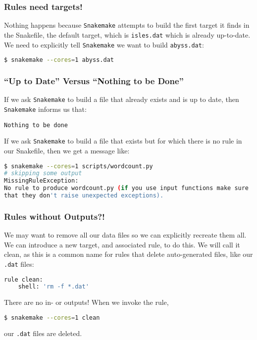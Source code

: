 \begin{frame}[fragile]
  \frametitle{Rules need targets!}
  Nothing happens because \texttt{Snakemake} attempts to build the first target it finds in the Snakefile, the default target, which is \texttt{isles.dat} which is already up-to-date. We need to explicitly tell \texttt{Snakemake} we want to build \texttt{abyss.dat}:
  \begin{lstlisting}[language=Bash, style=Shell]
$ snakemake --cores=1 abyss.dat
  \end{lstlisting}
\end{frame}

\begin{frame}[fragile]
  \frametitle{``Up to Date'' Versus ``Nothing to be Done''}
  If we ask \texttt{Snakemake} to build a file that already exists and is up to date, then \texttt{Snakemake} informs us that:
  \begin{lstlisting}[style=Plain]
Nothing to be done
  \end{lstlisting}
  \pause
  If we ask \texttt{Snakemake} to build a file that exists but for which there is no rule in our Snakefile, then we get a message like:
  \begin{lstlisting}[language=Bash, style=Shell, basicstyle=\footnotesize]
$ snakemake --cores=1 scripts/wordcount.py
# skipping some output
MissingRuleException:
No rule to produce wordcount.py (if you use input functions make sure
that they don't raise unexpected exceptions).
  \end{lstlisting}
\end{frame}

\begin{frame}[fragile]
  \frametitle{Rules without Outputs?!}
  We may want to remove all our data files so we can explicitly recreate them all. We can introduce a new target, and associated rule, to do this. We will call it clean, as this is a common name for rules that delete auto-generated files, like our \texttt{.dat} files:
  \begin{lstlisting}[language=Python,style=Python]
rule clean:
    shell: 'rm -f *.dat'
  \end{lstlisting}
  There are no in- or outputs! When we invoke the rule, 
  \begin{lstlisting}[language=Bash, style=Shell]
$ snakemake --cores=1 clean
  \end{lstlisting}
  our  \texttt{.dat} files are deleted.
\end{frame}

